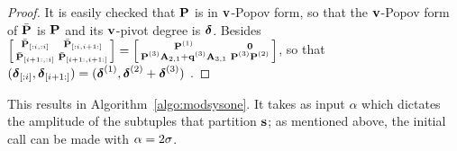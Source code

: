 \documentclass[preprint]{sig-alternate-05-2015}
\begin{document}
\begin{proof}
  It is easily checked that $\msb$ is in $\shifts[v]$-Popov form, so that the
  $\shifts[v]$-Popov form of $\bar{\msb}$ is $\msb$ and its $\shifts[v]$-pivot
  degree is $\minDegs$. Besides $\left[\begin{smallmatrix}
      \subMat{\bar{\msb}}{}{i}{}{i} & \subMat{\bar{\msb}}{}{i}{i+1}{} \\
      \subMat{\bar{\msb}}{i+1}{}{}{i} & \subMat{\bar{\msb}}{i+1}{}{i+1}{}
  \end{smallmatrix}\right]
      = \left[\begin{smallmatrix} \msb^{(1)} & \mat{0} \\ \msb^{(3)} \mat{A}_{2,1} +
      \col{q}^{(3)} \mat{A}_{3,1} & \msb^{(3)} \msb^{(2)}
  \end{smallmatrix}\right]$,
  so that 
  $(\subVec{\minDegs}{}{i},\subVec{\minDegs}{i+1}{}) = (\minDegs^{(1)},\minDegs^{(2)}+\minDegs^{(3)})$
  \cite[Section 3]{JeNeScVi16}.
\end{proof}
\vspace{-0.2cm}

This results in Algorithm~\ref{algo:modsysone}. It takes as input $\alpha$
which dictates the amplitude of the subtuples that partition $\shifts$; as
mentioned above, the initial call can be made with $\alpha = 2\degMod$.
\end{document}
